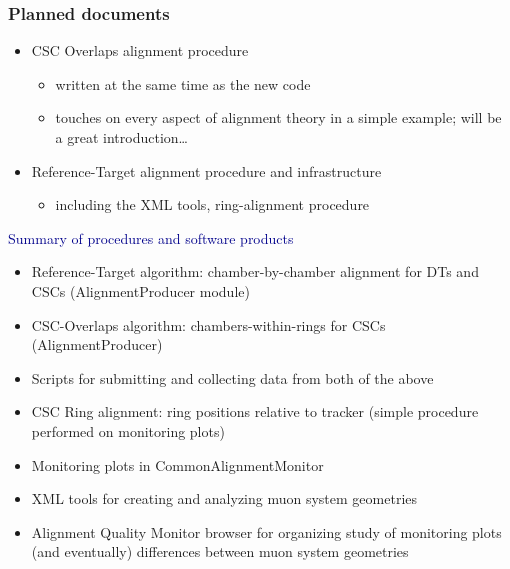\documentclass[compress]{beamer}
\begin{document}
\begin{frame}
\frametitle{Planned documents}

\begin{itemize}
\item CSC Overlaps alignment procedure
\begin{itemize}
\item written at the same time as the new code
\item touches on every aspect of alignment theory in a simple example; will be a great introduction\ldots
\end{itemize}

\item Reference-Target alignment procedure and infrastructure
\begin{itemize}
\item including the XML tools, ring-alignment procedure
\end{itemize}
\end{itemize}

\vspace{0.2 cm}
\hspace{-0.83 cm} \textcolor{darkblue}{\Large Summary of procedures and software products}

\scriptsize
\vspace{0.1 cm}
\begin{itemize}
\item Reference-Target algorithm: chamber-by-chamber alignment for DTs and CSCs (AlignmentProducer module)
\item CSC-Overlaps algorithm: chambers-within-rings for CSCs (AlignmentProducer)
\item Scripts for submitting and collecting data from both of the above
\item CSC Ring alignment: ring positions relative to tracker (simple procedure performed on monitoring plots)
\item Monitoring plots in CommonAlignmentMonitor
\item XML tools for creating and analyzing muon system geometries
\item Alignment Quality Monitor browser for organizing study of monitoring plots (and eventually) differences between muon system geometries
\end{itemize}

\label{numpages}
\end{frame}
\end{document}
